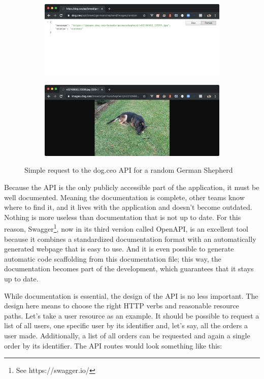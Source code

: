 \begin{figure}[ht]
  \centering
  \begin{subfigure}[b]{0.75\linewidth}
    \includegraphics[width=\linewidth]{assets/dog-api-request.jpg}
  \end{subfigure}
  \begin{subfigure}[b]{0.75\linewidth}
    \includegraphics[width=\linewidth]{assets/dog-api-image.jpg}
  \end{subfigure}
  \caption{Simple request to the dog.ceo API for a random German Shepherd}
  \label{fig:dog-api}
\end{figure}

Because the API is the only publicly accessible part of the application, it must be well documented. Meaning the documentation is complete, other teams know where to find it, and it lives with the application and doesn't become outdated. Nothing is more useless than documentation that is not up to date. For this reason, Swagger\footnote{See https://swagger.io/}, now in its third version called OpenAPI, is an excellent tool because it combines a standardized documentation format with an automatically generated webpage that is easy to use. And it is even possible to generate automatic code scaffolding from this documentation file; this way, the documentation becomes part of the development, which guarantees that it stays up to date.

While documentation is essential, the design of the API is no less important. The design here means to choose the right HTTP verbs and reasonable resource paths. Let's take a user resource as an example. It should be possible to request a list of all users, one specific user by its identifier and, let's say, all the orders a user made. Additionally, a list of all orders can be requested and again a single order by its identifier. The API routes would look something like this:

